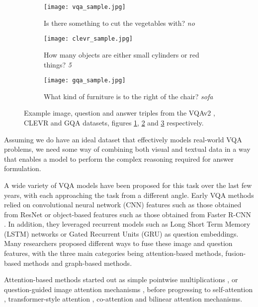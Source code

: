 \begin{figure}
  \begin{subfigure}[t]{0.3\textwidth}
    \centering
    \texttt{[image: vqa\_sample.jpg]} 
    \caption{Is there something to cut the vegetables with? \textit{no}}
    \label{fig:vqa_sample}
  \end{subfigure}
  \hfill
  \begin{subfigure}[t]{0.3\textwidth}
    \centering
    \texttt{[image: clevr\_sample.jpg]} 
    \caption{How many objects are either small cylinders or red things? \textit{5}}
    \label{fig:clevr_sample}
  \end{subfigure}
  \hfill
  \begin{subfigure}[t]{0.3\textwidth}
    \centering
    \texttt{[image: gqa\_sample.jpg]} 
    \caption{What kind of furniture is to the right of the chair? \textit{sofa}}
    \label{fig:gqa_sample}
  \end{subfigure}
  \caption[Example instances from the VQAv2, CLEVR and GQA datasets.]{Example image, question and answer triples from the VQAv2 \cite{goyal2017making}, CLEVR \cite{johnson2017clevr} and GQA \cite{hudson2019gqa} datasets, figures \ref{fig:vqa_sample}, \ref{fig:clevr_sample} and \ref{fig:gqa_sample} respectively.}
  \label{fig:dataset_samples}
\end{figure}

Assuming we do have an ideal dataset that effectively models real-world VQA problems, we need some way of combining both visual and textual data in a way that enables a model to perform the complex reasoning required for answer formulation.

A wide variety of VQA models have been proposed for this task over the last few years, with each approaching the task from a different angle. Early VQA methods relied on convolutional neural network (CNN) features such as those obtained from ResNet \cite{he2016deep} or object-based features such as those obtained from Faster R-CNN \cite{ren2016faster}. In addition, they leveraged recurrent models such as Long Short Term Memory (LSTM) \cite{hochreiter1997long} networks or Gated Recurrent Units (GRU) \cite{cho2014learning} as question embeddings. Many researchers proposed different ways to fuse these image and question features, with the three main categories being attention-based methods, fusion-based methods and graph-based methods.

Attention-based methods started out as simple pointwise multiplications \cite{antol2015vqa}, or question-guided image attention mechanisms \cite{anderson2018bottom}, before progressing to self-attention \cite{hudson2018compositional}, transformer-style attention \cite{vaswani2017attention}, co-attention \cite{lu2016hierarchical, yu2019deep} and bilinear attention \cite{kim2018bilinear} mechanisms.

